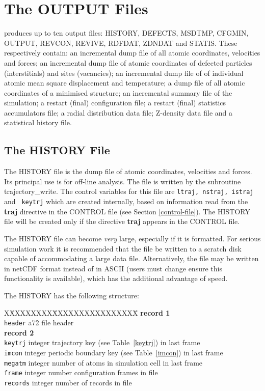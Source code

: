 \section{The OUTPUT Files}
\label{output-files}

\D produces up to ten output files: HISTORY, DEFECTS, MSDTMP,
CFGMIN, OUTPUT, REVCON, REVIVE, RDFDAT, ZDNDAT and STATIS.
These respectively contain: an incremental dump file of all
atomic coordinates, velocities and forces; an incremental
dump file of atomic coordinates of defected particles
(interstitials) and sites (vacancies); an incremental dump
file of of individual atomic mean square displacement and
temperature; a dump file of all atomic coordinates of a
minimised structure; an incremental summary file of the
simulation; a restart (final) configuration file; a restart
(final) statistics accumulators file; a radial distribution
data file; Z-density data file and a statistical history file.

\subsection{The HISTORY File}
\label{history-file}

The HISTORY file is the dump file of atomic coordinates, velocities
and forces.  Its principal use is for off-line analysis.  The file
is written by the subroutine {\sc trajectory\_write}.  The control
variables for this file are {\tt ltraj, nstraj, istraj} and {\tt
keytrj} which are created internally, based on information read from
the {\bf traj} directive in the CONTROL file (see Section
\ref{control-file}).  The HISTORY file will be created only if the
directive {\bf traj} appears in the CONTROL file.

The HISTORY file can become {\em very} large, especially if it is
formatted.  For serious simulation work it is recommended that the
file be written to a scratch disk capable of accommodating a large
data file.  Alternatively, the file may be written in netCDF format
instead of in ASCII (users must change ensure this functionality is
available), which has the additional advantage of speed.

The HISTORY has the following structure:
\begin{tabbing}
X\=XXXXXXXX\=XXXXXXXXXXXXXXXX\=\kill
{\bf record 1} \\
\> {\tt header}  \> a72     \> file header \\
{\bf record 2} \\
\> {\tt keytrj}  \> integer \> trajectory key (see Table~\ref{keytrj}) in last frame \\
\> {\tt imcon}   \> integer \> periodic boundary key (see Table~\ref{imcon}) in last frame \\
\> {\tt megatm}  \> integer \> number of atoms in simulation cell in last frame \\
\> {\tt frame}   \> integer \> number configuration frames in file \\
\> {\tt records} \> integer \> number of records in file
\end{tabbing}

